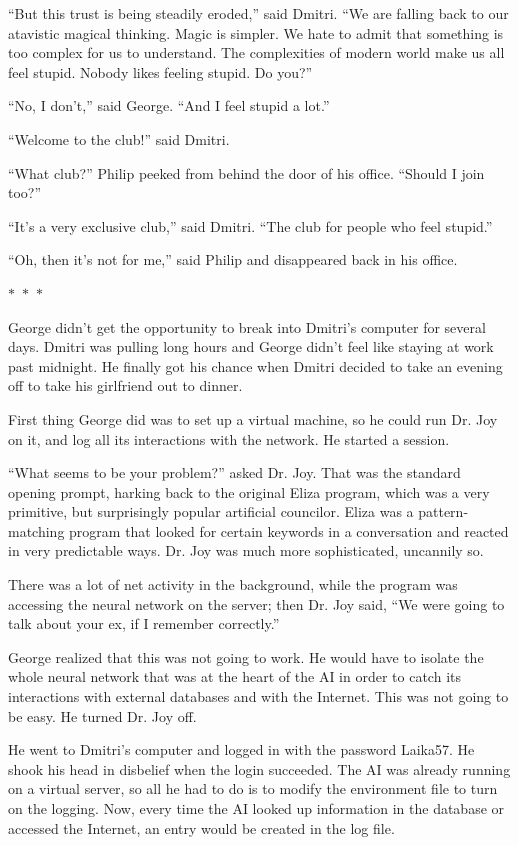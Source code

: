 \documentclass{memoir}
\newcommand{\starbreak}{%
\begin{center}
  $\ast$~$\ast$~$\ast$
\end{center}
}
\begin{document}
``But this trust is being steadily eroded,'' said Dmitri. ``We are falling back to our atavistic magical thinking. Magic is simpler. We hate to admit that something is too complex for us to understand. The complexities of modern world make us all feel stupid. Nobody likes feeling stupid. Do you?''

``No, I don't,'' said George. ``And I feel stupid a lot.''

``Welcome to the club!'' said Dmitri.

``What club?'' Philip peeked from behind the door of his office. ``Should I join too?''

``It's a very exclusive club,'' said Dmitri. ``The club for people who feel stupid.''

``Oh, then it's not for me,'' said Philip and disappeared back in his office.

\starbreak

George didn't get the opportunity to break into Dmitri's computer for several days. Dmitri was pulling long hours and George didn't feel like staying at work past midnight. He finally got his chance when Dmitri decided to take an evening off to take his girlfriend out to dinner. 

First thing George did was to set up a virtual machine, so he could run Dr. Joy on it, and log all its interactions with the network. He started a session. 

``What seems to be your problem?'' asked Dr. Joy. That was the standard opening prompt, harking back to the original Eliza program, which was a very primitive, but surprisingly popular artificial councilor. Eliza was a pattern-matching program that looked for certain keywords in a conversation and reacted in very predictable ways. Dr. Joy was much more sophisticated, uncannily so.

There was a lot of net activity in the background, while the program was accessing the neural network on the server; then Dr. Joy said, ``We were going to talk about your ex, if I remember correctly.''

George realized that this was not going to work. He would have to isolate the whole neural network that was at the heart of the AI in order to catch its interactions with external databases and with the Internet. This was not going to be easy. He turned Dr. Joy off.

He went to Dmitri's computer and logged in with the password Laika57. He shook his head in disbelief when the login succeeded. The AI was already running on a virtual server, so all he had to do is to modify the environment file to turn on the logging. Now, every time the AI looked up information in the database or accessed the Internet, an entry would be created in the log file.
\end{document}
